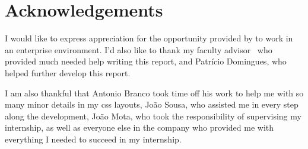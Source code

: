 


% 
% 
% 

\begingroup
\let\clearpage\relax
\let\cleardoublepage\relax
\let\cleardoublepage\relax
\chapter*{Acknowledgements}

I would like to express appreciation for the opportunity provided by \company \space to work
in an enterprise environment. I'd also like to thank my faculty advisor \myProf\,
who provided much needed help writing this report, and Patrício Domingues, who helped further develop this report.

I am also thankful that Antonio Branco took time off his work to help me with so many minor details in my \acrshort{css}
layouts, João Sousa, who assisted me in every step along the development, João Mota, who took the responsibility of supervising my internship,
as well as everyone else in the company who provided me with everything I needed to succeed in my internship.\\



\endgroup



